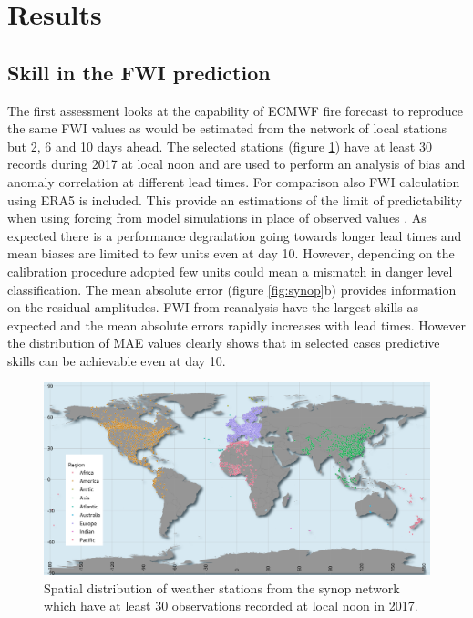 \documentclass[, manuscript]{copernicus}
\begin{document}
\section{Results}

\subsection{Skill in the FWI prediction}

The first assessment looks at the capability of ECMWF fire forecast to
reproduce the same FWI values as would be estimated from the network of
local stations but 2, 6 and 10 days ahead. The selected stations (figure
\ref{fig:Figure2}) have at least 30 records during 2017 at local noon
and are used to perform an analysis of bias and anomaly correlation at
different lead times. For comparison also FWI calculation using ERA5 is
included. This provide an estimations of the limit of predictability
when using forcing from model simulations in place of observed values
\citep{digiuseppe:16}. As expected there is a performance degradation
going towards longer lead times and mean biases are limited to few units
even at day 10. However, depending on the calibration procedure adopted
few units could mean a mismatch in danger level classification. The mean
absolute error (figure \ref{fig:synop}b) provides information on the
residual amplitudes. FWI from reanalysis have the largest skills as
expected and the mean absolute errors rapidly increases with lead times.
However the distribution of MAE values clearly shows that in selected
cases predictive skills can be achievable even at day 10.

\begin{figure}
\includegraphics[width=1\linewidth]{../images/synops_col} \caption{\label{fig:Figure2}Spatial distribution of weather stations from the synop network  which have at least 30 observations recorded at local noon in 2017.}\label{fig:Figure2}
\end{figure}
\end{document}
